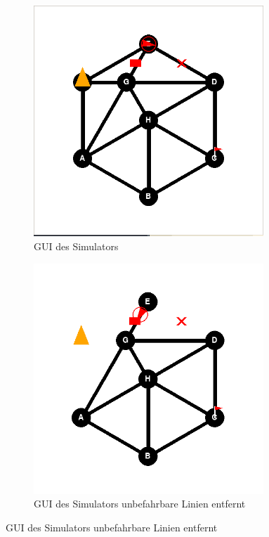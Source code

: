 \begin{figure}[H]
\begin{subfigure}{0.49\textwidth}
\includegraphics[width=0.95\textwidth]{assets/informatik-prototyp/simulator/sim-ui.png}
\caption{GUI des Simulators}
\label{fig:sim-gui}
\end{subfigure}
\begin{subfigure}{0.49\textwidth}
\includegraphics[width=0.95\textwidth]{assets/informatik-prototyp/simulator/removed-lines-sim.png}
\caption{GUI des Simulators unbefahrbare Linien entfernt}
\label{fig:sim-gui-removed-lines}
\end{subfigure}
\end{figure}


